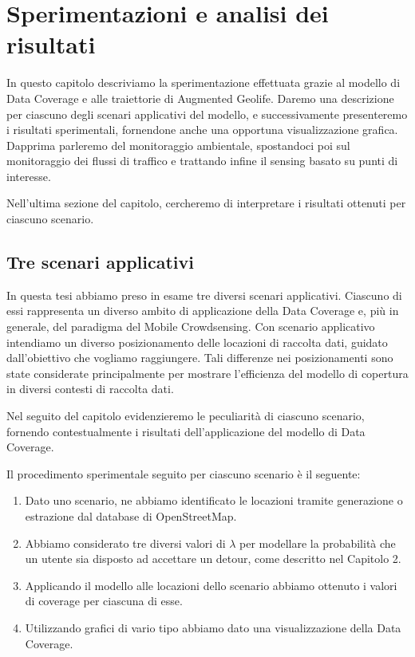 \chapter{Sperimentazioni e analisi dei risultati}
In questo capitolo descriviamo la sperimentazione effettuata grazie al modello di Data Coverage e alle traiettorie di Augmented Geolife.
Daremo una descrizione per ciascuno degli scenari applicativi del modello, e successivamente presenteremo i risultati sperimentali, fornendone anche una opportuna visualizzazione grafica. Dapprima parleremo del monitoraggio ambientale, spostandoci poi sul monitoraggio dei flussi di traffico e trattando infine il sensing basato su punti di interesse.

Nell'ultima sezione del capitolo, cercheremo di interpretare i risultati ottenuti per ciascuno scenario.


\section{Tre scenari applicativi}
In questa tesi abbiamo preso in esame tre diversi scenari applicativi. Ciascuno di essi rappresenta un diverso ambito di applicazione della Data Coverage e, più in generale, del paradigma del Mobile Crowdsensing.
Con scenario applicativo intendiamo un diverso posizionamento delle locazioni di raccolta dati, guidato dall'obiettivo che vogliamo raggiungere. Tali differenze nei posizionamenti sono state considerate principalmente per mostrare l'efficienza del modello di copertura in diversi contesti di raccolta dati.
 
Nel seguito del capitolo evidenzieremo le peculiarità di ciascuno scenario, fornendo contestualmente i risultati dell'applicazione del modello di Data Coverage.

Il procedimento sperimentale seguito per ciascuno scenario è il seguente:
\begin{enumerate}
	\item Dato uno scenario, ne abbiamo identificato le locazioni tramite generazione o estrazione dal database di OpenStreetMap.
	\item Abbiamo considerato tre diversi valori di $\lambda$ per modellare la probabilità che un utente sia disposto ad accettare un detour, come descritto nel Capitolo 2. 
	\item Applicando il modello alle locazioni dello scenario abbiamo ottenuto i valori di coverage per ciascuna di esse.
	\item Utilizzando grafici di vario tipo abbiamo dato una visualizzazione della Data Coverage.
\end{enumerate}

